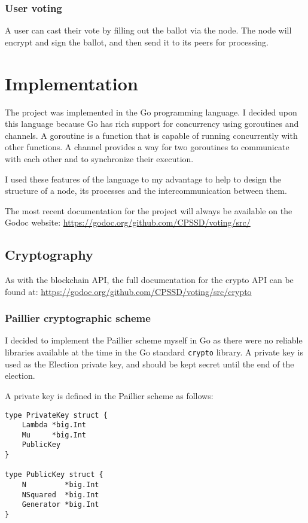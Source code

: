 \documentclass[a4paper,12pt]{article}
\begin{document}
\subsubsection{User voting}
A user can cast their vote by filling out the ballot via the node. The node will encrypt and sign the ballot, and then send it to its peers for processing.

\section{Implementation}
The project was implemented in the Go programming language. I decided upon this language because Go has rich support for concurrency using goroutines and channels. A goroutine is a function that is capable of running concurrently with other functions. A channel provides a way for two goroutines to communicate with each other and to synchronize their execution.

I used these features of the language to my advantage to help to design the structure of a node, its processes and the intercommunication between them.

The most recent documentation for the project will always be available on the Godoc website:
\url{https://godoc.org/github.com/CPSSD/voting/src/}

\subsection{Cryptography}
As with the blockchain API, the full documentation for the crypto API can be found at:
\url{https://godoc.org/github.com/CPSSD/voting/src/crypto}

\subsubsection{Paillier cryptographic scheme}
I decided to implement the Paillier scheme myself in Go as there were no reliable libraries available at the time in the Go standard \verb|crypto| library. A private key is used as the Election private key, and should be kept secret until the end of the election.

A private key is defined in the Paillier scheme as follows:
\begin{Verbatim}[obeytabs,tabsize=4]
type PrivateKey struct {
	Lambda *big.Int
	Mu     *big.Int
	PublicKey
}

type PublicKey struct {
	N         *big.Int
	NSquared  *big.Int
	Generator *big.Int
}
\end{Verbatim}
\end{document}
